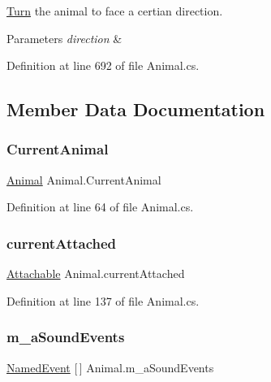\mbox{\hyperlink{class_turn}{Turn}} the animal to face a certian direction. 


\begin{DoxyParams}{Parameters}
{\em direction} & \\
\hline
\end{DoxyParams}


Definition at line 692 of file Animal.\+cs.



\subsection{Member Data Documentation}
\mbox{\label{class_animal_aa0ed151e61e4543ea3b6b176792cf4f5}} 
\subsubsection{\texorpdfstring{Current\+Animal}{CurrentAnimal}}
{\footnotesize\ttfamily \mbox{\hyperlink{class_animal}{Animal}} Animal.\+Current\+Animal\hspace{0.3cm}{\ttfamily [static]}}



Definition at line 64 of file Animal.\+cs.

\mbox{\label{class_animal_a9bed81572e69bafb08e1ee7fe8fbe944}} 
\subsubsection{\texorpdfstring{current\+Attached}{currentAttached}}
{\footnotesize\ttfamily \mbox{\hyperlink{class_attachable}{Attachable}} Animal.\+current\+Attached}



Definition at line 137 of file Animal.\+cs.

\mbox{\label{class_animal_a7c8b3a199529db24d4177f96cc34f435}} 
\subsubsection{\texorpdfstring{m\+\_\+a\+Sound\+Events}{m\_aSoundEvents}}
{\footnotesize\ttfamily \mbox{\hyperlink{class_animal_1_1_named_event}{Named\+Event}} \mbox{[}$\,$\mbox{]} Animal.\+m\+\_\+a\+Sound\+Events}



